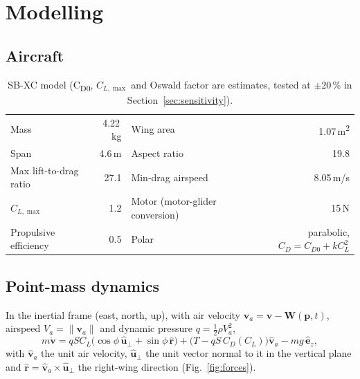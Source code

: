 \documentclass[11pt,a4paper,oneside]{report}
\newcommand{\vect}[1]{\boldsymbol{#1}}
\newcommand{\CL}{C_L}
\newcommand{\CLmax}{C_{L,\max}}
\begin{document}
\chapter{Modelling}\label{ch:model}

\section{Aircraft}
\begin{table}[ht]\centering\small
\caption{SB-XC model (C\textsubscript{D0}, $\CLmax$ and Oswald factor are estimates, tested at $\pm$20\,\% in Section~\ref{sec:sensitivity}).}\label{tab:aircraft}
\begin{tabular}{@{}lr@{\qquad}lr@{}}
\toprule
Mass & 4.22\,kg & Wing area & 1.07\,m\textsuperscript{2} \\
Span & 4.6\,m & Aspect ratio & 19.8 \\
Max lift-to-drag ratio & 27.1 & Min-drag airspeed & 8.05\,m/s \\
$\CLmax$ & 1.2 & Motor (motor-glider conversion) & 15\,N \\
Propulsive efficiency & 0.5 & Polar & parabolic, $C_D = C_{D0} + k\CL^2$ \\
\bottomrule
\end{tabular}
\end{table}

\section{Point-mass dynamics}
In the inertial frame (east, north, up), with air velocity $\vect v_a = \vect v - \vect W(\vect p,t)$, airspeed $V_a = \|\vect v_a\|$ and dynamic pressure $q = \tfrac12\rho V_a^2$,
\begin{equation}\label{eq:dyn}
m\dot{\vect v} = q S \CL\big(\cos\phi\,\hat{\vect u}_\perp + \sin\phi\,\hat{\vect r}\big) + \big(T - qS\,C_D(\CL)\big)\hat{\vect v}_a - m g\,\hat{\vect e}_z,
\end{equation}
with $\hat{\vect v}_a$ the unit air velocity, $\hat{\vect u}_\perp$ the unit vector normal to it in the vertical plane and $\hat{\vect r} = \hat{\vect v}_a\times\hat{\vect u}_\perp$ the right-wing direction (Fig.~\ref{fig:forces}).
\end{document}
